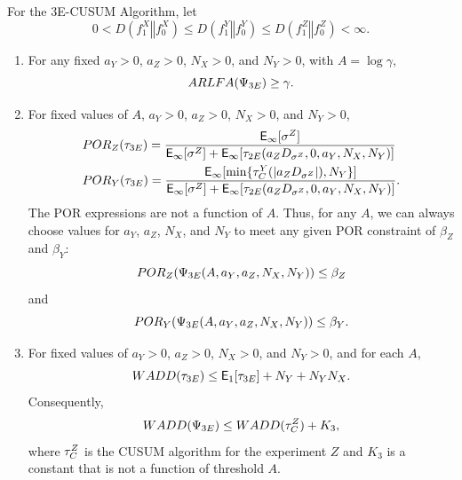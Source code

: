 \documentclass[10pt,a4paper]{amsart}
\begin{document}
\begin{theorem}
\label{thm:3e}

For the \textup{3E-CUSUM} Algorithm, let 
$$ 0 < D(f_1^X \mathrel{\Vert} f_0^X) \leq D(f_1^Y \mathrel{\Vert} f_0^Y) \leq D(f_1^Z \mathrel{\Vert} f_0^Z) < \infty. $$

\begin{enumerate}
\item For any fixed $a_Y > 0$, $a_Z > 0$, $N_X > 0$, and $N_Y > 0$, with $A = \log \gamma$,
$$ \textup{ARLFA} (\Psi_{\textup{3E}}) \geq \gamma. $$

\item For fixed values of $A$, $a_Y > 0$, $a_Z > 0$, $N_X > 0$, and $N_Y > 0$,
\begin{align*}
& \textup{POR}_Z (\tau_{\textup{\fontsize{6 pt}{10 pt}\selectfont 3E}})  = \frac{\mathsf{E}_\infty [\sigma^Z]}{\mathsf{E}_\infty [\sigma^Z] + \mathsf{E}_\infty [\tau_{\textup{\fontsize{6 pt}{10 pt}\selectfont 2E}}(a_Z D_{\sigma^Z}, 0, a_Y, N_X, N_Y)]} \\
& \textup{POR}_Y (\tau_{\textup{\fontsize{6 pt}{10 pt}\selectfont 3E}})  = \frac{\mathsf{E}_\infty [\min
\{ \tau_{\textup{\fontsize{6 pt}{10 pt}\selectfont C}}^Y (\vert a_Z D_{\sigma^Z}\vert), N_Y \}]}{\mathsf{E}_\infty [\sigma^Z] + \mathsf{E}_\infty [\tau_{\textup{\fontsize{6 pt}{10 pt}\selectfont 2E}}(a_Z D_{\sigma^Z}, 0, a_Y, N_X, N_Y)]}.
\end{align*}
The POR expressions are not a function of $A$. Thus, for any $A$, we can always choose values for $a_Y$, $a_Z$, $N_X$, and $N_Y$ to meet any given POR constraint of $\beta_Z$ and $\beta_Y$:
$$ \textup{POR}_Z (\Psi_{\textup{3E}} (A, a_Y, a_Z, N_X, N_Y)) \leq \beta_Z $$
and
$$ \textup{POR}_Y (\Psi_{\textup{3E}} (A, a_Y, a_Z, N_X, N_Y)) \leq \beta_Y. $$

\item For fixed values of $a_Y > 0$, $a_Z > 0$, $N_X > 0$, and $N_Y > 0$, and for each $A$,
$$ \textup{WADD} (\tau_{\textup{\fontsize{6 pt}{10 pt}\selectfont 3E}}) \leq \mathsf{E}_1 [\tau_{\textup{\fontsize{6 pt}{10 pt}\selectfont 3E}}] + N_Y + N_Y N_X. $$
Consequently, 
$$ \textup{WADD} (\Psi_{\textup{3E}}) \leq \textup{WADD} (\tau_{\textup{\fontsize{6 pt}{10 pt}\selectfont C}}^Z) + K_3, $$
where $\tau_{\textup{\fontsize{6 pt}{10 pt}\selectfont C}}^Z$ is the \textup{CUSUM} algorithm for the experiment $Z$ and $K_3$ is a constant that is not a function of threshold $A$. 
\end{enumerate}
\end{theorem}
\end{document}
